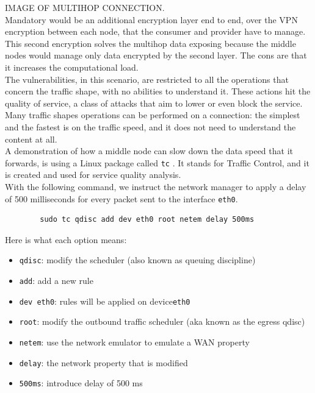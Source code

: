 \documentclass[12pt]{article}
\begin{document}
	IMAGE OF MULTIHOP CONNECTION.\\

	Mandatory would be an additional encryption layer end to end, over the VPN encryption between each node, that the consumer and provider have to manage. This second encryption solves the multihop data exposing because the middle nodes would manage only data encrypted by the second layer. The cons are that it increases the computational load.\\
	The vulnerabilities, in this scenario, are restricted to all the operations that concern the traffic shape, with no abilities to understand it. These actions hit the quality of service, a class of attacks that aim to lower or even block the service.\\
	Many traffic shapes operations can be performed on a connection: the simplest and the fastest is on the traffic speed, and it does not need to understand the content at all.\\
	A demonstration of how a middle node can slow down the data speed that it forwards, is using a Linux package called \lstinline{tc} \cite{tc}. It stands for Traffic Control, and it is created and used for service quality analysis.\\
	With the following command, we instruct the network manager to apply a delay of 500 milliseconds for every packet sent to the interface \lstinline{eth0}.\\
	
	\begin{lstlisting}
		sudo tc qdisc add dev eth0 root netem delay 500ms
	\end{lstlisting}
	
	Here is what each option means:
	\begin{itemize}
		\item \lstinline{qdisc}: modify the scheduler (also known as queuing discipline)
		\item \lstinline{add}: add a new rule
		\item \lstinline{dev eth0}: rules will be applied on device\lstinline{eth0}
		\item \lstinline{root}: modify the outbound traffic scheduler (aka known as the egress qdisc)
		\item \lstinline{netem}: use the network emulator to emulate a WAN property
		\item \lstinline{delay}: the network property that is modified
		\item \lstinline{500ms}: introduce delay of 500 ms
	\end{itemize}
\end{document}
